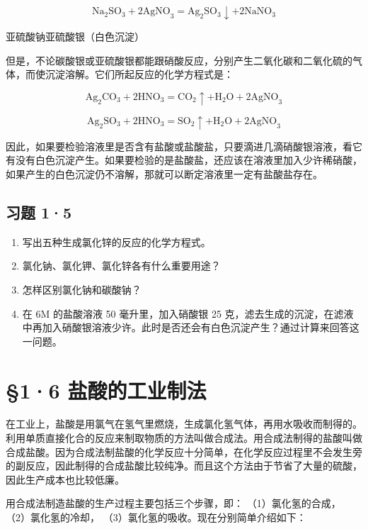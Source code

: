\[
\mathrm{Na} _ {2} \mathrm{SO} _ {3} + 2 \mathrm{AgNO} _ {3} = \mathrm{Ag} _ {2} \mathrm{SO} _ {3} \downarrow + 2 \mathrm{NaNO} _ {3}
\]

亚硫酸钠亚硫酸银（白色沉淀）

但是，不论碳酸银或亚硫酸银都能跟硝酸反应，分别产生二氧化碳和二氧化硫的气体，而使沉淀溶解。它们所起反应的化学方程式是：

\[
\mathrm{Ag} _ {2} \mathrm{CO} _ {3} + 2 \mathrm{HNO} _ {3} = \mathrm{CO} _ {2} \uparrow + \mathrm{H} _ {2} \mathrm{O} + 2 \mathrm{AgNO} _ {3}
\]

\[
\mathrm{Ag} _ {2} \mathrm{SO} _ {3} + 2 \mathrm{HNO} _ {3} = \mathrm{SO} _ {2} \uparrow + \mathrm{H} _ {2} \mathrm{O} + 2 \mathrm{AgNO} _ {3}
\]

因此，如果要检验溶液里是否含有盐酸或盐酸盐，只要滴进几滴硝酸银溶液，看它有没有白色沉淀产生。如果要检验的是盐酸盐，还应该在溶液里加入少许稀硝酸，如果产生的白色沉淀仍不溶解，那就可以断定溶液里一定有盐酸盐存在。

\subsection{习题 1·5}

\begin{enumerate}
\item
  写出五种生成氯化锌的反应的化学方程式。
\item
  氯化钠、氯化钾、氯化锌各有什么重要用途？
\item
  怎样区别氯化钠和碳酸钠？
\item
  在 6M 的盐酸溶液 50 毫升里，加入硝酸银 25
  克，滤去生成的沉淀，在滤液中再加入硝酸银溶液少许。此时是否还会有白色沉淀产生？通过计算来回答这一问题。
\end{enumerate}

\section{§1·6 盐酸的工业制法}

在工业上，盐酸是用氯气在氢气里燃烧，生成氯化氢气体，再用水吸收而制得的。利用单质直接化合的反应来制取物质的方法叫做合成法。用合成法制得的盐酸叫做合成盐酸。因为合成法制盐酸的化学反应十分简单，在化学反应过程里不会发生旁的副反应，因此制得的合成盐酸比较纯净。而且这个方法由于节省了大量的硫酸，因此生产成本也比较低廉。

用合成法制造盐酸的生产过程主要包括三个步骤，即： （1）氯化氢的合成，
（2）氯化氢的冷却， （3）氯化氢的吸收。现在分别简单介绍如下：

